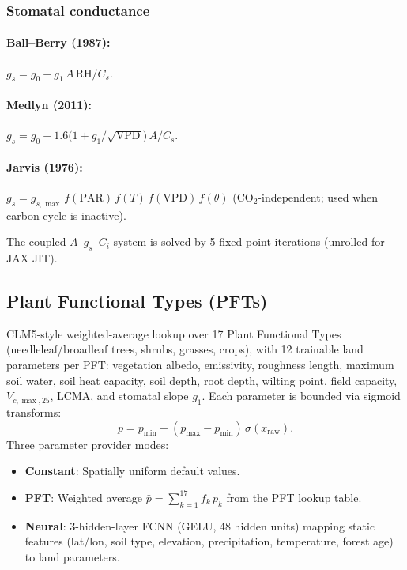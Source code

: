 \documentclass[11pt,a4paper]{article}
\begin{document}
\subsubsection{Stomatal conductance}

\paragraph{Ball--Berry (1987):}
$g_s = g_0 + g_1\,A\,\mathrm{RH}/C_s.$

\paragraph{Medlyn (2011):}
$g_s = g_0 + 1.6\bigl(1+g_1/\!\sqrt{\mathrm{VPD}}\bigr)\,A/C_s.$

\paragraph{Jarvis (1976):}
$g_s = g_{s,\max}\,f(\mathrm{PAR})\,f(T)\,f(\mathrm{VPD})\,f(\theta)$ \quad (CO$_2$-independent; used when carbon cycle is inactive).

The coupled $A$--$g_s$--$C_i$ system is solved by 5 fixed-point iterations (unrolled for JAX JIT).

\subsection{Plant Functional Types (PFTs)}

CLM5-style weighted-average lookup over 17 Plant Functional Types (needleleaf/broadleaf trees, shrubs, grasses, crops), with 12 trainable land parameters per PFT: vegetation albedo, emissivity, roughness length, maximum soil water, soil heat capacity, soil depth, root depth, wilting point, field capacity, $V_{c,\max,25}$, LCMA, and stomatal slope $g_1$.  Each parameter is bounded via sigmoid transforms:
\begin{equation}
  p = p_{\min} + (p_{\max}-p_{\min})\,\sigma(x_{\mathrm{raw}}).
\end{equation}
Three parameter provider modes:
\begin{itemize}[nosep]
  \item \textbf{Constant}: Spatially uniform default values.
  \item \textbf{PFT}: Weighted average $\bar p=\sum_{k=1}^{17}f_k\,p_k$ from the PFT lookup table.
  \item \textbf{Neural}: 3-hidden-layer FCNN (GELU, 48 hidden units) mapping static features (lat/lon, soil type, elevation, precipitation, temperature, forest age) to land parameters.
\end{itemize}
\end{document}
